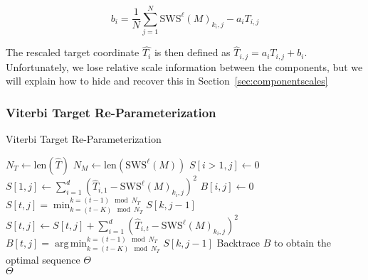 \documentclass[runningheads]{llncs}
\DeclareMathOperator*{\argmin}{arg\,min}
\begin{document}
\begin{equation}
  b_i = \frac{1}{N} \sum_{j=1}^N  \text{SWS}^{\ell} (M)_{k_i, j} - a_i T_{i, j}
\end{equation}

The rescaled target coordinate $\hat{T_i}$ is then defined as $\hat{T}_{i, j} = a_i T_{i, j} + b_i$.  Unfortunately, we lose relative scale information between the components, but we will explain how to hide and recover this in Section~\ref{sec:componentscales}

\subsubsection{Viterbi Target Re-Parameterization}


\algrenewcommand\algorithmicindent{0.8em}%
\begin{algorithm}
  \caption{Viterbi Target Re-Parameterization}

  \begin{algorithmic}[1]
    \State $N_T \gets \text{len}(\hat{T})$ 
    \State $N_M \gets \text{len}(\text{SWS}^{\ell}(M))$ 
    \State $S[i>1, j] \gets 0$ 
    \State $S[1, j] \gets \sum_{i=1}^d (\hat{T}_{i, 1} - \text{SWS}^{\ell} (M)_{k_i, j})^2$
    \State $B[i, j] \gets 0$ 
            \State $S[t, j] = \min_{k=(t-K) \mod N_T} ^ {k=(t-1) \mod N_T} S[k, j-1] $ 
            \State $S[t, j] \gets S[t, j] + \sum_{i=1}^d (\hat{T}_{i, t} - \text{SWS}^{\ell} (M)_{k_i, j})^2$ 
            \State $B[t, j] = \argmin_{k=(t-K) \mod N_T} ^ {k=(t-1) \mod N_T} S[k, j-1] $ 
        \EndFor
    \EndFor
    \State Backtrace $B$ to obtain the optimal sequence $\Theta$ \\
    \Return $\Theta$
    \EndProcedure
  \end{algorithmic}
  \label{alg:viterbiwarp}
\end{algorithm}
\end{document}
